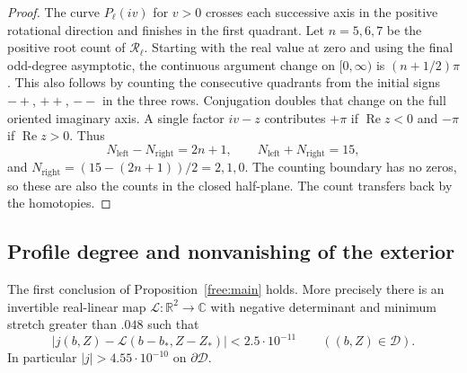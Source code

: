 \begin{proof}
The curve $P_\ell(iv)$ for $v>0$ crosses each successive axis in the
positive rotational direction and finishes in the first quadrant.
Let $n=5,6,7$ be the positive root count of $\mathcal R_\ell$.
Starting with the real value at zero and using the final odd-degree
asymptotic, the continuous argument change on $[0,\infty)$ is
$(n+1/2)\pi$.  This also follows by counting the consecutive quadrants
from the initial signs $-+$, $++$, $--$ in the three rows.  Conjugation
doubles that change on the full oriented imaginary axis.  A single
factor $iv-z$ contributes $+\pi$ if $\operatorname{Re}z<0$ and
$-\pi$ if $\operatorname{Re}z>0$.  Thus
\[
 N_{\mathrm{left}}-N_{\mathrm{right}}=2n+1,
 \qquad N_{\mathrm{left}}+N_{\mathrm{right}}=15,
\]
and $N_{\mathrm{right}}=(15-(2n+1))/2=2,1,0$.
The counting boundary has no zeros, so these are also the counts in
the closed half-plane.  The count transfers back by the homotopies.
\end{proof}

\subsection{Profile degree and nonvanishing of the exterior}

\begin{lemma}\label{free:profile-degree}
The first conclusion of Proposition~\ref{free:main} holds.  More
precisely there is an invertible real-linear map
$\mathcal L:\mathbb R^2\to\mathbb C$ with negative determinant and
minimum stretch greater than $.048$ such that
\begin{equation}\label{free:profile-linearization}
 |j(b,Z)-\mathcal L(b-b_*,Z-Z_*)|<2.5\cdot10^{-11}
 \qquad((b,Z)\in\mathcal D).
\end{equation}
In particular $|j|>4.55\cdot10^{-10}$ on $\partial\mathcal D$.
\end{lemma}

